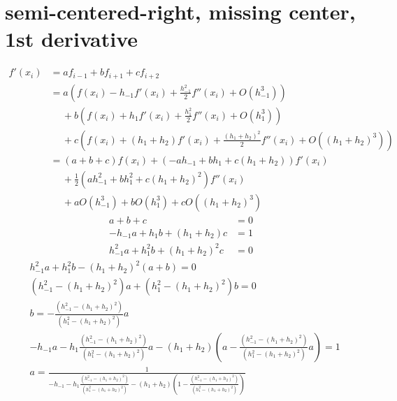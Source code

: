 \documentclass{article}
\begin{document}
\section{semi-centered-right, missing center, 1st derivative}
\begin{align}
    f'\left( x_i \right) &= af_{i-1} + bf_{i+1} + cf_{i+2}
    \\
    &= a\left( f\left( x_i \right) - h_{-1}f'\left( x_i \right) + \frac{h_{-1}^2}{2}f''\left( x_i \right) + O\left( h_{-1}^3 \right) \right)
    \\ \nonumber
    &\quad\ + b\left( f\left( x_i \right) + h_{1}f'\left( x_i \right) + \frac{h_{1}^2}{2}f''\left( x_i \right) + O\left( h_{1}^3 \right)\right)
    \\ \nonumber
    &\quad\ + c\left( f\left( x_{i} \right) + \left( h_{1} + h_{2} \right)f'\left( x_i \right) + \frac{{\left( h_{1} + h_{2} \right)}^2}{2}f''\left( x_i \right) + O\left( {\left( h_{1} + h_{2} \right)}^3 \right)\right)
    \\
    &= \left( a + b + c \right)f\left( x_i \right)
    + \left( -ah_{-1} + bh_{1} + c\left( h_1 + h_2 \right) \right)f'\left( x_i \right)
    \\ \nonumber
    &\quad\ + \frac{1}{2}\left( ah_{-1}^2 + bh_{1}^{2} + c{\left(h_{1} + h_2\right)}^2 \right)f''\left( x_i \right)
    \\ \nonumber
    &\quad\ + aO\left( h_{-1}^3 \right) + bO\left( h_1^3 \right) + cO\left( {\left( h_1 + h_2 \right)}^3 \right)
    \label{}
\end{align}
\begin{align}
    a + b + c &= 0
    \\
    -h_{-1}a + h_{1}b + \left( h_1 + h_{2} \right)c &= 1
    \\
    h_{-1}^{2}a + h_{1}^{2}b + {\left( h_1 + h_2 \right)}^2c &= 0
\end{align}
\begin{align}
    &h_{-1}^{2}a + h_{1}^{2}b - {\left( h_1 + h_2 \right)}^2\left( a+b \right) = 0
    \\
    &\left( h_{-1}^{2} - {\left( h_1 + h_2 \right)}^2 \right)a + \left( h_1^2 - {\left( h_1 + h_2 \right)}^2 \right)b = 0
    \\
    &b = -\frac{\left( h_{-1}^{2} - {\left( h_1 + h_2 \right)}^2 \right)}{\left( h_1^2 - {\left( h_1 + h_2 \right)}^2 \right)}a
    \\
    &-h_{-1}a - h_{1}\frac{\left( h_{-1}^{2} - {\left( h_1 + h_2 \right)}^2 \right)}{\left( h_1^2 - {\left( h_1 + h_2 \right)}^2 \right)}a - \left( h_1 + h_2 \right)\left( a - \frac{\left( h_{-1}^{2} - {\left( h_1 + h_2 \right)}^2 \right)}{\left( h_1^2 - {\left( h_1 + h_2 \right)}^2 \right)}a \right) = 1
    \\
    &a = \frac{1}{-h_{-1} - h_{1}\frac{\left( h_{-1}^{2} - {\left( h_1 + h_2 \right)}^2 \right)}{\left( h_1^2 - {\left( h_1 + h_2 \right)}^2 \right)} - \left( h_1 + h_2 \right)\left( 1 - \frac{\left( h_{-1}^{2} - {\left( h_1 + h_2 \right)}^2 \right)}{\left( h_1^2 - {\left( h_1 + h_2 \right)}^2 \right)} \right)}
    \label{}
\end{align}
\end{document}
